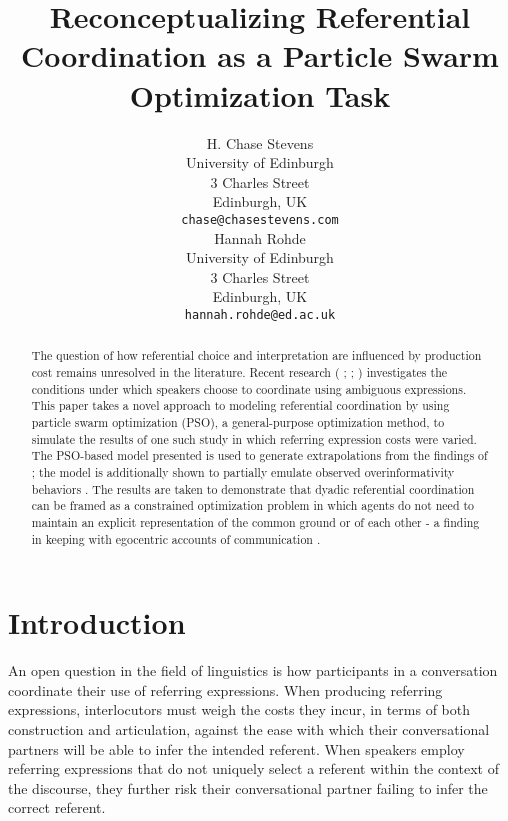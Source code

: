 \documentclass[11pt]{article}
\title{Reconceptualizing Referential Coordination as a Particle Swarm Optimization Task}
\author{H. Chase Stevens \\
  University of Edinburgh \\
  3 Charles Street \\
  Edinburgh, UK \\
  {\tt chase@chasestevens.com} \\\And
  Hannah Rohde \\
  University of Edinburgh \\
  3 Charles Street \\
  Edinburgh, UK \\
  {\tt hannah.rohde@ed.ac.uk} \\}
\date{}
\begin{document}
\maketitle
\begin{abstract}
The question of how referential choice and interpretation are influenced by production cost remains unresolved in the literature. Recent research (\citeauthor{rohde2012} \citeyear{rodhe2012}; \citeauthor{degen2012} \citeyear{degen2012}; \citeauthor{frank2012} \citeyear{frank2012}) investigates the conditions under which speakers choose to coordinate using ambiguous expressions. This paper takes a novel approach to modeling referential coordination by using particle swarm optimization (PSO), a general-purpose optimization method, to simulate the results of one such study \citep{rohde2012} in which referring expression costs were varied. The PSO-based model presented is used to generate extrapolations from the findings of \cite{rohde2012}; the model is additionally shown to partially emulate observed overinformativity behaviors \citep{brennan1996}. The results are taken to demonstrate that dyadic referential coordination can be framed as a constrained optimization problem in which agents do not need to maintain an explicit representation of the common ground or of each other - a finding in keeping with egocentric accounts of communication \citep{horton1996}.
\end{abstract}



\section{Introduction}
An open question in the field of linguistics is how participants in a conversation coordinate their use of referring expressions. When producing referring expressions, interlocutors must weigh the costs they incur, in terms of both construction and articulation, against the ease with which their conversational partners will be able to infer the intended referent. When speakers employ referring expressions that do not uniquely select a referent within the context of the discourse, they further risk their conversational partner failing to infer the correct referent. 
\end{document}
